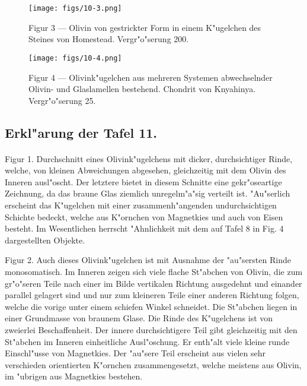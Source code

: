 \documentclass[a4paper, 11pt, oneside, polutonikogreek, german]{article}
\begin{document}
\vspace*{\fill}
\begin{figure}[H]
\centering
\texttt{[image: figs/10-3.png]}
\caption{\small Figur 3 --- Olivin von gestrickter Form in einem K"ugelchen des Steines von Homestead. Vergr"o"serung 200.}
\end{figure}
\vspace*{\fill}
\clearpage

\vspace*{\fill}
\begin{figure}[H]
\centering
\texttt{[image: figs/10-4.png]}
\caption{\small Figur 4 --- Olivink"ugelchen aus mehreren Systemen abwechselnder Olivin- und Glaslamellen bestehend. Chondrit von Knyahinya. Vergr"o"serung 25.}
\end{figure}
\vspace*{\fill}
\clearpage

\subsection{Erkl"arung der Tafel 11.}
\paragraph{}
Figur 1. Durchschnitt eines Olivink"ugelchens mit dicker, durchsichtiger Rinde, welche, von kleinen Abweichungen abgesehen, gleichzeitig mit dem Olivin des Inneren ausl"oscht. Der letztere bietet in diesem Schnitte eine gekr"oseartige Zeichnung, da das braune Glas ziemlich unregelm"a"sig verteilt ist. "Au"serlich erscheint das K"ugelchen mit einer zusammenh"angenden undurchsichtigen Schichte bedeckt, welche aus K"ornchen von Magnetkies und auch von Eisen besteht. Im Wesentlichen herrscht "Ahnlichkeit mit dem auf Tafel 8 in Fig. 4 dargestellten Objekte.

Figur 2. Auch dieses Olivink"ugelchen ist mit Ausnahme der "au"sersten Rinde monosomatisch. Im Inneren zeigen sich viele flache St"abchen von Olivin, die zum gr"o"seren Teile nach einer im Bilde vertikalen Richtung ausgedehnt und einander parallel gelagert sind und nur zum kleineren Teile einer anderen Richtung folgen, welche die vorige unter einem schiefen Winkel schneidet. Die St"abchen liegen in einer Grundmasse von braunem Glase. Die Rinde des K"ugelchens ist von zweierlei Beschaffenheit. Der innere durchsichtigere Teil gibt gleichzeitig mit den St"abchen im Inneren einheitliche Ausl"oschung. Er enth"alt viele kleine runde Einschl"usse von Magnetkies. Der "au"sere Teil erscheint aus vielen sehr verschieden orientierten K"ornchen zusammengesetzt, welche meistens aus Olivin, im "ubrigen aus Magnetkies bestehen.
\end{document}
